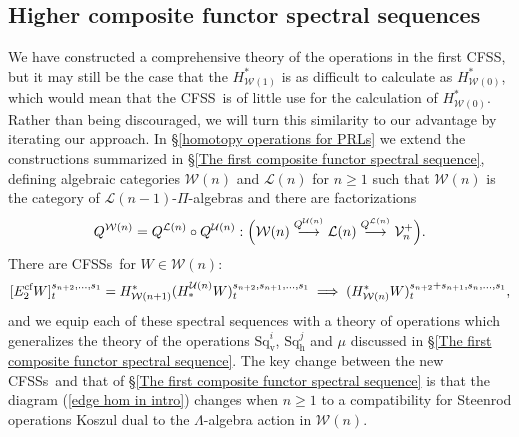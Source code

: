 \documentclass[11pt]{amsart} \renewcommand{\baselinestretch}{1.2}
\theoremstyle{plain}
\numberwithin{equation}{section} %
\theoremstyle{plain}
\numberwithin{equation}{chapter} %
\renewcommand{\to}{\longrightarrow}
\newcommand{\calW}{\mathcal{W}}
\newcommand{\calU}{\mathcal{U}}
\newcommand{\calV}{\mathcal{V}}
\newcommand{\calw}{\mathcal{W}}
\newcommand{\calu}{\mathcal{U}}
\newcommand{\call}{\mathcal{L}}
\newcommand{\vect}[2]{\calV^{#1}_{#2}}
\newcommand{\E}[5]{[E^{#1}_{#2}#3]^{#4}_{#5}}
\newcommand{\dver}{_\mathrm{v}}
\newcommand{\dhor}{_\mathrm{h}}
\newcommand{\Sqh}{\mathrm{Sq}\dhor}
\newcommand{\Sqv}{\mathrm{Sq}\dver}
\newcommand{\CFSS}{CFSS}
\newcommand{\CFSSs}{CFSSs}
\newcommand{\SubsectionOrSection}[1]{\subsection{#1}}
\begin{document}
\begin{Introduction}
\SubsectionOrSection{Higher composite functor spectral sequences}\label{Higher composite functor spectral sequences}
We have constructed a comprehensive theory of the operations in the first \CFSS, but it may still be the case that the $H^*_{\calw(1)}$ is as difficult to calculate as $H^*_{\calw(0)}$, which would mean that the \CFSS\ is of little use for the calculation of $H^*_{\calw(0)}$. Rather than being discouraged, we will turn this similarity to our advantage by iterating our approach. %
 In \S\ref{homotopy operations for PRLs} we extend the constructions summarized in \S\ref{The first composite functor spectral sequence}, defining algebraic categories $\calw(n)$ and $\call(n)$ for $n\geq1$ such that $\calw(n)$ is the category of $\call(n-1)$-$\Pi$-algebras and there are factorizations 
\[Q^{\calw(n)}=Q^{\call(n)}\circ Q^{\calu(n)}:\Bigl(\calw(n)\overset{Q^{\calu(n)}}{\to}\call(n)\overset{Q^{\call(n)}}{\to}\vect{+}{n}\Bigr).\]
There are \CFSSs\ for $W\in\calw(n)$:
\[\E{\textup{cf}}{2}{W}{s_{n+2},\ldots,s_1}{t}=H^*_{\calw(n+1)}(H_*^{\calu(n)}W)^{s_{n+2},s_{n+1},\ldots,s_1}_t\implies (H^*_{\calw(n)} W)_t^{s_{n+2}+s_{n+1},s_n,\ldots,s_1},\]
and we equip each of these spectral sequences with a theory of operations which generalizes the theory of the operations $\Sqv^i$, $\Sqh^j$ and $\mu$ discussed in \S\ref{The first composite functor spectral sequence}. The key change between the new \CFSSs\ and that of \S\ref{The first composite functor spectral sequence} is that the diagram (\ref{edge hom in intro}) changes when $n\geq1$ to %
a compatibility for Steenrod operations Koszul dual to the $\Lambda$-algebra action in $\calw(n)$.


\end{Introduction}
\end{document}
